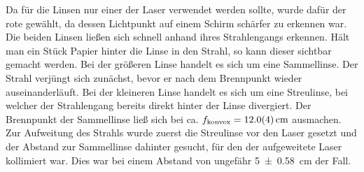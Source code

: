 		Da für die Linsen nur einer der Laser verwendet werden sollte, wurde dafür der rote gewählt, da dessen Lichtpunkt auf einem Schirm schärfer zu erkennen war.
		Die beiden Linsen ließen sich schnell anhand ihres Strahlengangs erkennen.
		Hält man ein Stück Papier hinter die Linse in den Strahl, so kann dieser sichtbar gemacht werden.
		Bei der größeren Linse handelt es sich um eine Sammellinse.
		Der Strahl verjüngt sich zunächst, bevor er nach dem Brennpunkt wieder auseinanderläuft.
		Bei der kleineren Linse handelt es sich um eine Streulinse, bei welcher der Strahlengang bereits direkt hinter der Linse divergiert. %
		Der Brennpunkt der Sammellinse ließ sich bei ca. $f_\text{konvex} = \SI{12+-0,4}{\centi\meter}$ ausmachen.
		Zur Aufweitung des Strahls wurde zuerst die Streulinse vor den Laser gesetzt und der Abstand zur Sammellinse dahinter gesucht, für den der aufgeweitete Laser kollimiert war.
		Dies war bei einem Abstand von ungefähr \SI{5+-0,58}{\centi\meter} der Fall.
		
